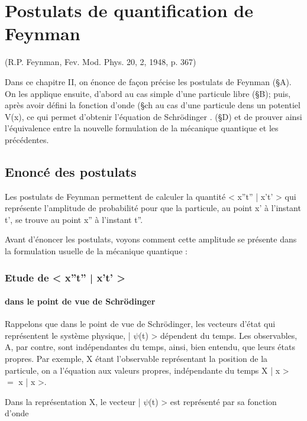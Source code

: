 \chapter{Postulats de quantification de Feynman}

\hfill (R.P. Feynman, Fev. Mod. Phys. 20, 2, 1948, p. 367)

\vspace{.5cm}
Dans ce chapitre II, on énonce de façon précise les postulats de Feynman
(\S A). On les applique ensuite, d'abord au cas simple d'une particule libre
(\S B); puis, après avoir défini la fonction d'onde (\S ch au cas d'une particule dens un potentiel V(x), ce qui permet d'obtenir l'équation de Schrödinger .
(\S D) et de prouver ainsi l'équivalence entre la nouvelle formulation de la
mécanique quantique et les précédentes.

\section{Enoncé des postulats}

Les postulats de Feynman permettent de calculer la quantité
< x''t'' | x't' > qui représente l'amplitude de probabilité pour que la
particule, au point x' à l'instant t', se trouve au point x'' à l'instant
t''.

Avant d'énoncer les postulats, voyons comment cette amplitude
se présente dans la formulation usuelle de la mécanique quantique :

\subsection{Etude de < x''t'' | x't' >}

\subsubsection{dans le point de vue de Schrödinger}

Rappelons que dans le point de vue de Schrödinger, les vecteurs
d'état qui représentent le système physique, | $\psi$(t) > dépendent du temps.
Les observables, A, par contre, sont indépendantes du temps, ainsi, bien
entendu, que leurs états propres. Par exemple, X étant l'observable représentant
la position de la particule, on a l'équation aux valeurs propres,
indépendante du temps X | x > $=$ x | x >.

Dans la représentation X, le vecteur | $\psi$(t) > est représenté
par sa fonction d'onde

